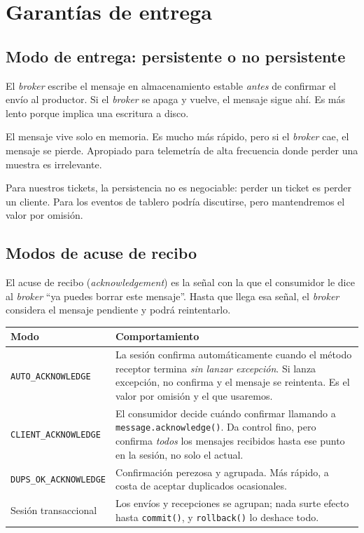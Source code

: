 \documentclass[11pt,a4paper]{book}
\newcommand{\clase}[1]{\texttt{#1}}
\begin{document}
\chapter{Garantías de entrega}
\label{cap:garantias}

\section{Modo de entrega: persistente o no persistente}

\begin{description}[leftmargin=1.6em,style=nextline,itemsep=3pt]
	\item[\texttt{PERSISTENT} (valor por omisión).] El \emph{broker} escribe el mensaje en almacenamiento estable \emph{antes} de confirmar el envío al productor. Si el \emph{broker} se apaga y vuelve, el mensaje sigue ahí. Es más lento porque implica una escritura a disco.
	\item[\texttt{NON\_PERSISTENT}.] El mensaje vive solo en memoria. Es mucho más rápido, pero si el \emph{broker} cae, el mensaje se pierde. Apropiado para telemetría de alta frecuencia donde perder una muestra es irrelevante.
\end{description}

Para nuestros tickets, la persistencia no es negociable: perder un ticket es perder un cliente.
Para los eventos de tablero podría discutirse, pero mantendremos el valor por omisión.

\section{Modos de acuse de recibo}

El acuse de recibo (\emph{acknowledgement}) es la señal con la que el consumidor le dice al \emph{broker} ``ya puedes borrar este mensaje''.
Hasta que llega esa señal, el \emph{broker} considera el mensaje pendiente y podrá reintentarlo.

\begin{center}
	\small
	\begin{tabularx}{\textwidth}{@{}p{4.4cm}X@{}}
		\toprule
		\textbf{Modo} & \textbf{Comportamiento} \\
		\midrule
		\texttt{AUTO\_ACKNOWLEDGE} & La sesión confirma automáticamente cuando el método receptor termina \emph{sin lanzar excepción}. Si lanza excepción, no confirma y el mensaje se reintenta. Es el valor por omisión y el que usaremos. \\
		\texttt{CLIENT\_ACKNOWLEDGE} & El consumidor decide cuándo confirmar llamando a \clase{message.acknowledge()}. Da control fino, pero confirma \emph{todos} los mensajes recibidos hasta ese punto en la sesión, no solo el actual. \\
		\texttt{DUPS\_OK\_ACKNOWLEDGE} & Confirmación perezosa y agrupada. Más rápido, a costa de aceptar duplicados ocasionales. \\
		Sesión transaccional & Los envíos y recepciones se agrupan; nada surte efecto hasta \clase{commit()}, y \clase{rollback()} lo deshace todo. \\
		\bottomrule
	\end{tabularx}
\end{center}
\end{document}

